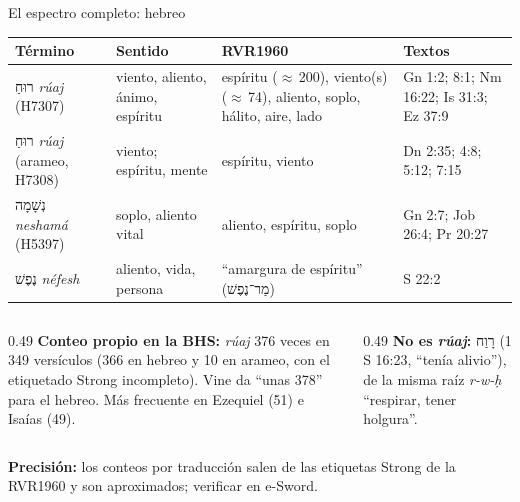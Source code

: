 \documentclass[hyperref={bookmarks=false},aspectratio=169]{beamer}
\newcommand{\heb}[1]{\mbox{\foreignlanguage{hebrew}{#1}}}
\newcommand{\precision}[1]{{\footnotesize\color{gris}\textbf{Precisión:} #1}}
\begin{document}
\begin{frame}{El espectro completo: hebreo}
\scriptsize\renewcommand{\arraystretch}{1.12}
\begin{tabular}{@{}>{\RaggedRight\arraybackslash}p{2.8cm}>{\RaggedRight\arraybackslash}p{3.1cm}>{\RaggedRight\arraybackslash}p{3.0cm}>{\RaggedRight\arraybackslash}p{2.9cm}@{}}
\toprule
\textbf{Término} & \textbf{Sentido} & \textbf{RVR1960} & \textbf{Textos} \\ \midrule
\heb{רוּחַ} \emph{rúaj} (H7307) & viento, aliento, ánimo, espíritu & espíritu ($\approx$\,200), viento(s) ($\approx$\,74), aliento, soplo, hálito, aire, lado & Gn 1:2; 8:1; Nm 16:22; Is 31:3; Ez 37:9 \\
\heb{רוּחַ} \emph{rúaj} (arameo, H7308) & viento; espíritu, mente & espíritu, viento & Dn 2:35; 4:8; 5:12; 7:15 \\
\heb{נְשָׁמָה} \emph{neshamá} (H5397) & soplo, aliento vital & aliento, espíritu, soplo & Gn 2:7; Job 26:4; Pr 20:27 \\
\heb{נֶפֶשׁ} \emph{néfesh} & aliento, vida, persona & ``amargura de espíritu'' (\heb{מַר־נֶפֶשׁ}) & 1 S 22:2 \\
\bottomrule
\end{tabular}\par\medskip
\begin{columns}[t,onlytextwidth]
\begin{column}{0.49\textwidth}\scriptsize
\textbf{Conteo propio en la BHS:} \emph{rúaj} 376 veces en 349 versículos (366 en hebreo y 10 en arameo, con el etiquetado Strong incompleto). Vine da ``unas 378'' para el hebreo. Más frecuente en Ezequiel (51) e Isaías (49).
\end{column}
\begin{column}{0.49\textwidth}\scriptsize
\textbf{No es \emph{rúaj}:} \heb{רָוַח} (1 S 16:23, ``tenía alivio''), de la misma raíz \emph{r-w-ḥ} ``respirar, tener holgura''.
\end{column}
\end{columns}
\precision{los conteos por traducción salen de las etiquetas Strong de la RVR1960 y son aproximados; verificar en e-Sword.}
\end{frame}
\end{document}
